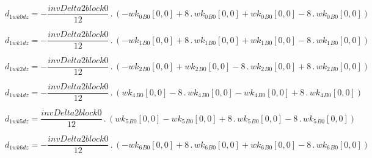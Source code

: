 \documentclass{article}
\begin{document}
\begin{dmath}d_{1 wk0 dz} = - \frac{invDelta2block0}{12} \,.\, \left(- {wk_{0}{_{B0}}}[{0,0}] + 8 \,.\, {wk_{0}{_{B0}}}[{0,0}] + {wk_{0}{_{B0}}}[{0,0}] - 8 \,.\, {wk_{0}{_{B0}}}[{0,0}]\right)\end{dmath}

\begin{dmath}d_{1 wk1 dz} = - \frac{invDelta2block0}{12} \,.\, \left(- {wk_{1}{_{B0}}}[{0,0}] + 8 \,.\, {wk_{1}{_{B0}}}[{0,0}] + {wk_{1}{_{B0}}}[{0,0}] - 8 \,.\, {wk_{1}{_{B0}}}[{0,0}]\right)\end{dmath}

\begin{dmath}d_{1 wk2 dz} = - \frac{invDelta2block0}{12} \,.\, \left(- {wk_{2}{_{B0}}}[{0,0}] + {wk_{2}{_{B0}}}[{0,0}] - 8 \,.\, {wk_{2}{_{B0}}}[{0,0}] + 8 \,.\, {wk_{2}{_{B0}}}[{0,0}]\right)\end{dmath}

\begin{dmath}d_{1 wk4 dz} = - \frac{invDelta2block0}{12} \,.\, \left({wk_{4}{_{B0}}}[{0,0}] - 8 \,.\, {wk_{4}{_{B0}}}[{0,0}] - {wk_{4}{_{B0}}}[{0,0}] + 8 \,.\, {wk_{4}{_{B0}}}[{0,0}]\right)\end{dmath}

\begin{dmath}d_{1 wk5 dz} = \frac{invDelta2block0}{12} \,.\, \left({wk_{5}{_{B0}}}[{0,0}] - {wk_{5}{_{B0}}}[{0,0}] + 8 \,.\, {wk_{5}{_{B0}}}[{0,0}] - 8 \,.\, {wk_{5}{_{B0}}}[{0,0}]\right)\end{dmath}

\begin{dmath}d_{1 wk6 dz} = - \frac{invDelta2block0}{12} \,.\, \left(- {wk_{6}{_{B0}}}[{0,0}] + 8 \,.\, {wk_{6}{_{B0}}}[{0,0}] + {wk_{6}{_{B0}}}[{0,0}] - 8 \,.\, {wk_{6}{_{B0}}}[{0,0}]\right)\end{dmath}
\end{document}
